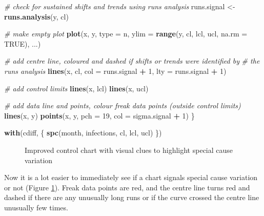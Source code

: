 \documentclass[
]{book}
\makeatletter
\newenvironment{Shaded}{\begin{snugshade}}{\end{snugshade}}
\newcommand{\AttributeTok}[1]{\textcolor[rgb]{0.13,0.29,0.53}{#1}}
\newcommand{\CommentTok}[1]{\textcolor[rgb]{0.56,0.35,0.01}{\textit{#1}}}
\newcommand{\ConstantTok}[1]{\textcolor[rgb]{0.56,0.35,0.01}{#1}}
\newcommand{\DecValTok}[1]{\textcolor[rgb]{0.00,0.00,0.81}{#1}}
\newcommand{\FunctionTok}[1]{\textcolor[rgb]{0.13,0.29,0.53}{\textbf{#1}}}
\newcommand{\NormalTok}[1]{#1}
\newcommand{\OtherTok}[1]{\textcolor[rgb]{0.56,0.35,0.01}{#1}}
\newcommand{\SpecialCharTok}[1]{\textcolor[rgb]{0.81,0.36,0.00}{\textbf{#1}}}
\newcommand{\StringTok}[1]{\textcolor[rgb]{0.31,0.60,0.02}{#1}}
\newcommand*\pandocbounded[1]{%
  \sbox\pandoc@box{#1}%
  \Gscale@div\@tempa{\textheight}{\dimexpr\ht\pandoc@box+\dp\pandoc@box\relax}%
  \Gscale@div\@tempb{\linewidth}{\wd\pandoc@box}%
  \ifdim\@tempb\p@<\@tempa\p@\let\@tempa\@tempb\fi%
  \ifdim\@tempa\p@<\p@\scalebox{\@tempa}{\usebox\pandoc@box}%
  \else\usebox{\pandoc@box}%
  \fi%
}
\makeatother
\begin{document}
\begin{Shaded}
\begin{Highlighting}[numbers=left,,]
  \CommentTok{\# check for sustained shifts and trends using runs analysis}
\NormalTok{  runs.signal }\OtherTok{\textless{}{-}} \FunctionTok{runs.analysis}\NormalTok{(y, cl)}
  
  \CommentTok{\# make empty plot}
  \FunctionTok{plot}\NormalTok{(x, y, }
       \AttributeTok{type =} \StringTok{\textquotesingle{}n\textquotesingle{}}\NormalTok{,}
       \AttributeTok{ylim =} \FunctionTok{range}\NormalTok{(y, cl, lcl, ucl, }\AttributeTok{na.rm =} \ConstantTok{TRUE}\NormalTok{),}
\NormalTok{       ...)}
  
  \CommentTok{\# add centre line, coloured and dashed if shifts or trends were identified by}
  \CommentTok{\# the runs analysis}
  \FunctionTok{lines}\NormalTok{(x, cl,}
        \AttributeTok{col =}\NormalTok{ runs.signal }\SpecialCharTok{+} \DecValTok{1}\NormalTok{,}
        \AttributeTok{lty =}\NormalTok{ runs.signal }\SpecialCharTok{+} \DecValTok{1}\NormalTok{)}
  
  \CommentTok{\# add control limits}
  \FunctionTok{lines}\NormalTok{(x, lcl)}
  \FunctionTok{lines}\NormalTok{(x, ucl)}
  
  \CommentTok{\# add data line and points, colour freak data points (outside control limits)}
  \FunctionTok{lines}\NormalTok{(x, y)}
  \FunctionTok{points}\NormalTok{(x, y,}
         \AttributeTok{pch =} \DecValTok{19}\NormalTok{,}
         \AttributeTok{col =}\NormalTok{ sigma.signal }\SpecialCharTok{+} \DecValTok{1}\NormalTok{)}
\NormalTok{\}}
\end{Highlighting}
\end{Shaded}

\begin{Shaded}
\begin{Highlighting}[]
\FunctionTok{with}\NormalTok{(cdiff, \{}
  \FunctionTok{spc}\NormalTok{(month, infections, cl, lcl, ucl)}
\NormalTok{\})}
\end{Highlighting}
\end{Shaded}

\begin{figure}
\centering
\pandocbounded{}
\caption{\label{fig:highlighting-spc2}Improved control chart with visual clues to highlight special cause variation}
\end{figure}

Now it is a lot easier to immediately see if a chart signals special cause variation or not (Figure \ref{fig:highlighting-spc2}). Freak data points are red, and the centre line turns red and dashed if there are any unusually long runs or if the curve crossed the centre line unusually few times.
\end{document}
